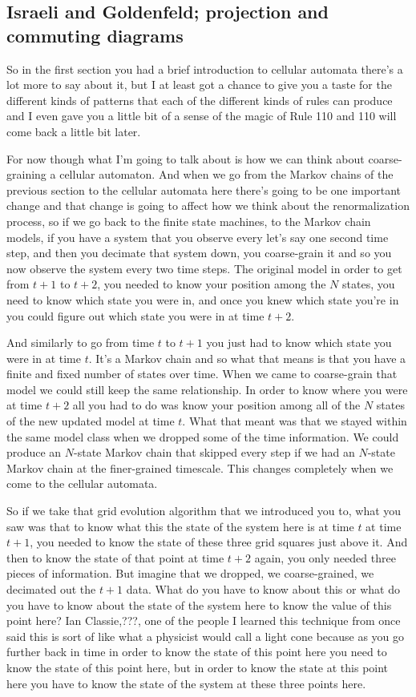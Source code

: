 \documentclass[]{article}
\begin{document}
\subsection{Israeli and Goldenfeld; projection and commuting diagrams }

So in the first section you had a brief introduction to cellular automata there's a lot more to say about it, but I at least got a chance to give you a taste for the different kinds of patterns that each of the different kinds of rules can produce and I even gave you a little bit of a sense of the magic of Rule 110 and 110 will come back a little bit later.

For now though what I'm going to talk about is how we can think about coarse-graining a cellular automaton.
And when we go from the Markov chains of the previous section to the cellular automata here there's going to be one important change and that change is going to affect how we think about the renormalization process, so if we go back to the finite state machines, to the Markov chain models, if you have a system that you observe every let's say one second time step, and then you decimate that system down,
you coarse-grain it and so you now observe the system every two time steps. 
The original model in order to get from $t+1$ to $t+2$, you needed to know your position among the $N$ states, you need to know which state you were in, and once you knew which state you're in you could figure out which state you were in at time $t+2$.

And similarly to go from time $t$ to $t+1$ you just had to know which state you were in at time $t$. It's a Markov chain and so what that means is that you have a finite and fixed number of states over time. When we came to coarse-grain that model 
we could still keep the same relationship. In order to know where you were at time $t+2$ all you had to do was know your position among all of the $N$ states of the
new updated model at time $t$. What that meant was that we stayed within the same model class when we dropped some of the time information. We could produce an $N$-state Markov chain that skipped every step if we had an $N$-state Markov chain at the finer-grained timescale. This changes completely when we come to the cellular automata.

So if we take that grid evolution algorithm that we introduced you to, what you saw was that to know what this the state of the system here is at time $t$ at time $t+1$,
you needed to know the state of these three grid squares just above it. And then to know the state of that point at time $t+2$ again, you only needed three pieces of information.
But imagine that we dropped, we coarse-grained, we decimated out the $t+1$ data.
What do you have to know about this or what do you have to know about the state of the system here to know the value of this point here? Ian Classie,???, one of the people I learned this technique from once said this is sort of like what a physicist would call a light cone because as you go further back in time in order to know the state of this point here you need to know the state of this point here, but in order to know the state at this point here you have to know the state of the system at 
these three points here.
\end{document}
